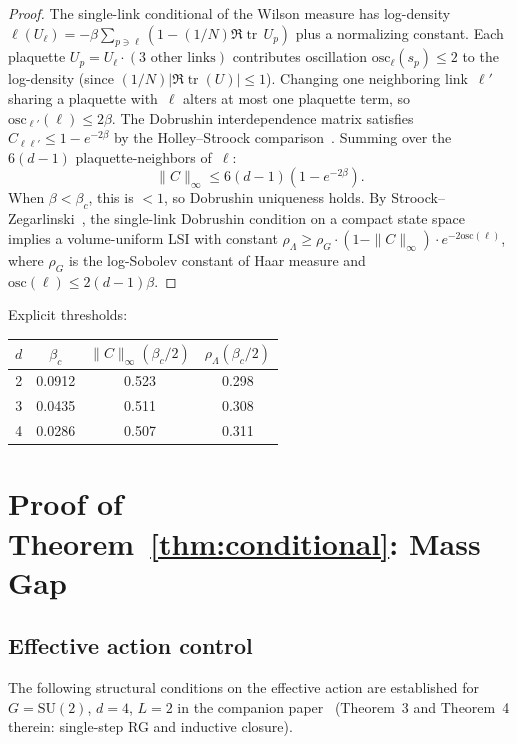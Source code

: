 \documentclass[11pt,a4paper]{article}
\theoremstyle{plain}
\theoremstyle{definition}
\theoremstyle{remark}
\newcommand{\tr}{\operatorname{tr}}
\newcommand{\SU}{\mathrm{SU}}
\newcommand{\osc}{\mathrm{osc}}
\begin{document}
\begin{proof}
The single-link conditional of the Wilson measure has
log-density $\ell(U_\ell) = -\beta\sum_{p \ni \ell}
(1 - (1/N)\Re\tr\,U_p)$ plus a normalizing constant.
Each plaquette $U_p = U_\ell \cdot (\text{3 other links})$
contributes oscillation $\osc_\ell(s_p) \leq 2$ to the
log-density (since $(1/N)|\Re\tr(U)| \leq 1$).
Changing one neighboring link~$\ell'$ sharing
a plaquette with~$\ell$ alters at most one plaquette
term, so $\osc_{\ell'}(\ell) \leq 2\beta$.
The Dobrushin interdependence matrix satisfies
$C_{\ell\ell'} \leq 1 - e^{-2\beta}$
by the Holley--Stroock comparison~\cite{HolleyStroock}.
Summing over the $6(d{-}1)$ plaquette-neighbors of~$\ell$:
\[
  \|C\|_\infty \leq 6(d{-}1)(1 - e^{-2\beta}).
\]
When $\beta < \beta_c$, this is $< 1$, so
Dobrushin uniqueness holds.
By Stroock--Zegarlinski~\cite{StroockZegarlinski},
the single-link Dobrushin condition on a compact state
space implies a volume-uniform LSI with constant
$\rho_\Lambda \geq \rho_G \cdot (1 - \|C\|_\infty)
\cdot e^{-2\osc(\ell)}$,
where $\rho_G$ is the log-Sobolev constant of
Haar measure and $\osc(\ell) \leq 2(d{-}1)\beta$.
\end{proof}

\noindent Explicit thresholds:
\begin{center}
\begin{tabular}{@{}cccc@{}}
\toprule
$d$ & $\beta_c$ & $\|C\|_\infty(\beta_c/2)$ &
$\rho_\Lambda(\beta_c/2)$ \\ \midrule
2 & 0.0912 & 0.523 & 0.298 \\
3 & 0.0435 & 0.511 & 0.308 \\
4 & 0.0286 & 0.507 & 0.311 \\
\bottomrule
\end{tabular}
\end{center}


\section{Proof of Theorem~\ref{thm:conditional}:
Mass Gap}\label{sec:conditional}

\subsection{Effective action control}

The following structural conditions on the effective action
are established for $G = \SU(2)$, $d = 4$, $L = 2$ in the
companion paper~\cite{FontesSU2}
(Theorem~3 and Theorem~4 therein: single-step RG
and inductive closure).
\end{document}
